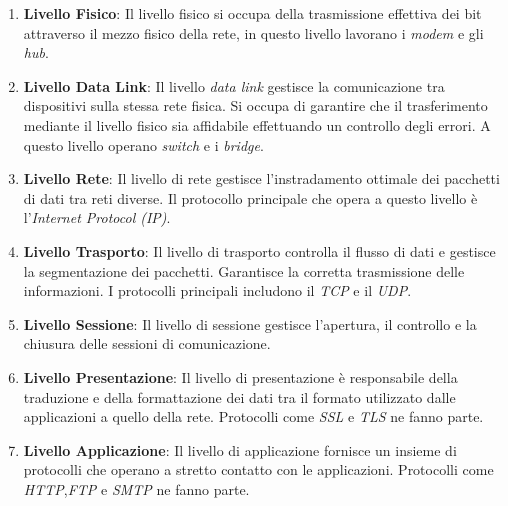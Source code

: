 \begin{enumerate}
    \item \textbf{Livello Fisico}: Il livello fisico si occupa della trasmissione effettiva dei bit attraverso il mezzo fisico della rete, in questo livello lavorano i \emph{modem} e gli \emph{hub}. 
    \item \textbf{Livello Data Link}: Il livello \emph{data link} gestisce la comunicazione tra dispositivi sulla stessa rete fisica. Si occupa di garantire che il trasferimento mediante il livello fisico sia affidabile effettuando un controllo degli errori. A questo livello operano \emph{switch} e i \emph{bridge}.
    \item \textbf{Livello Rete}: Il livello di rete gestisce l'instradamento ottimale dei pacchetti di dati tra reti diverse. Il protocollo principale che opera a questo livello è l'\emph{Internet Protocol (IP)}. 
    \item \textbf{Livello Trasporto}: Il livello di trasporto controlla il flusso di dati e gestisce la segmentazione dei pacchetti. Garantisce la corretta trasmissione delle informazioni. I protocolli principali includono il \emph{\gls*{TCP}} e il \emph{\gls*{UDP}}.
    \item \textbf{Livello Sessione}: Il livello di sessione gestisce l'apertura, il controllo e la chiusura delle sessioni di comunicazione. 
    \item \textbf{Livello Presentazione}: Il livello di presentazione è responsabile della traduzione e della formattazione dei dati tra il formato utilizzato dalle applicazioni a quello della rete. Protocolli come \emph{\gls*{SSL}} e \emph{\gls*{TLS}} ne fanno parte.
    \item \textbf{Livello Applicazione}: Il livello di applicazione fornisce un insieme di protocolli che operano a stretto contatto con le applicazioni. Protocolli come \emph{HTTP},\emph{FTP} e \emph{SMTP} ne fanno parte.

\end{enumerate}



